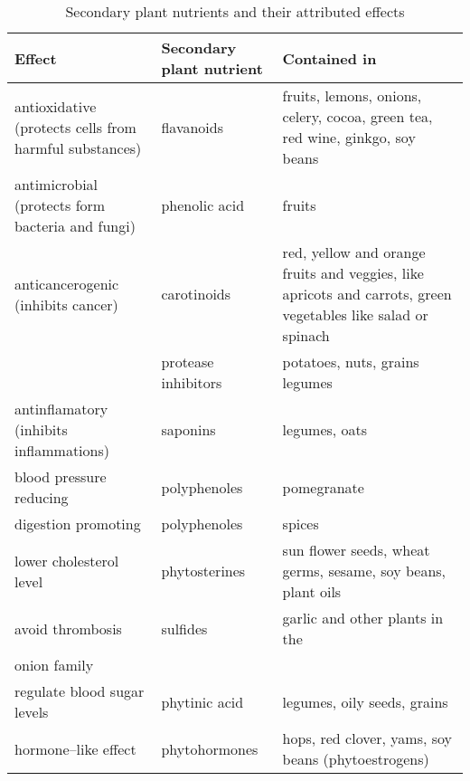 \documentclass[../main.tex]{subfiles}
\begin{document}
  \noindent
  \begin{table}[htb!]
    \centering
    \begin{tabular}{p{3.5cm}p{2.5cm}p{5.5cm}}
      \textbf{Effect} & \textbf{Secondary plant nutrient} & \textbf{Contained in} \\
      \hline
      antioxidative\index{effect!antioxidative} (protects cells from harmful substances) & flavanoids
                                                          & fruits, lemons, onions, celery, cocoa, green tea, red wine, ginkgo, soy beans \\
      antimicrobial\index{effect!antimicrobial} (protects form bacteria and fungi) & phenolic acid & fruits \\
      anticancerogenic\index{effect!anticancerogenic} (inhibits cancer) & carotinoids
                                                          & red, yellow and orange fruits and veggies, like apricots and carrots, green vegetables like salad or spinach \\
                      & protease inhibitors & potatoes, nuts, grains legumes \\
      antinflamatory\index{effect!antinflamatory} (inhibits inflammations) & saponins & legumes, oats \\
      blood pressure reducing\index{effect!blood pressure, reduce} & polyphenoles & pomegranate \\
      digestion promoting\index{effect!digestion, promote} & polyphenoles & spices\\
     lower cholesterol level\index{effect!cholesterol level, lower} & phytosterines & sun flower seeds, wheat germs, sesame, soy beans, plant oils \\
      avoid thrombosis\index{effect!thrombosis, avoid} & sulfides & garlic and other plants in the \\      onion family \\
      regulate blood sugar levels\index{effect!blood sugar level!regulate} & phytinic acid & legumes, oily seeds, grains \\
      hormone--like effect\index{effect!hormon--like effect} & phytohormones & hops, red clover, yams, soy beans (phytoestrogens)\\
      \end{tabular}
    \caption[Secondary plant nutrients]{Secondary plant nutrients and their attributed effects}
  \end{table}
\end{document}
